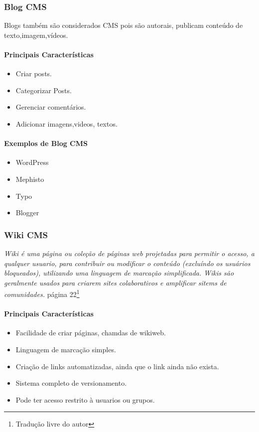 \subsubsection{Blog CMS} 

Blogs também são considerados CMS pois são autorais, publicam conteúdo de texto,imagem,vídeos.

\paragraph{Principais Características}

\begin{itemize}
  \item Criar posts.
  \item Categorizar Posts.
  \item Gerenciar comentários.
  \item Adicionar imagens,videos, textos.
\end{itemize}

\paragraph{Exemplos de Blog CMS} 

\begin{itemize}
  \item WordPress
  \item Mephisto
  \item Typo
  \item Blogger
\end{itemize}

\subsubsection{Wiki CMS} 

\emph{Wiki é uma página ou coleção de páginas web projetadas para permitir o acesso, a qualquer usuario, para contribuir ou modificar o conteúdo (excluíndo os usuários bloqueados), utilizando uma linguagem de marcação simplificada. Wikis são geralmente usados para criarem sites colaborativos e amplificar sitems de comunidades.}
\cite{choosing_open_source_cms}{página 22}\footnote{Tradução livre do autor} 


\paragraph{Principais Características}

\begin{itemize}
  \item Facilidade de criar páginas, chamdas de wikiweb.
  \item Linguagem de marcação simples.
  \item Criação de links automatizadas, ainda que o link ainda não exista.
  \item Sistema completo de versionamento.
  \item Pode ter acesso restrito à usuarios ou grupos.
\end{itemize}

